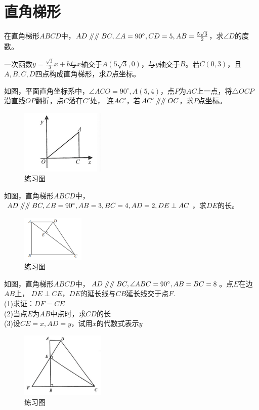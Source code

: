\documentclass{ecnuthesis}
\newcommand\px{\mathrel{/\mkern-5mu/}}  %
\begin{document}
\section{直角梯形}
\begin{problem}
    在直角梯形$ABCD$中，$AD\px\px BC,\angle A=90^\circ,CD=5,AB=\frac{5\sqrt3}{2}$，求$\angle D$的度数。\\
\end{problem}
\begin{problem}
    一次函数$y=\frac{\sqrt3}{3}x+b$与$x$轴交于$A(5\sqrt3,0)$，与$y$轴交于$B$。若$C(0,3)$，且$A,B,C,D$四点构成直角梯形，求$D$点坐标。\\
\end{problem}
\begin{problem}
    如图，平面直角坐标系中，$\angle ACO=90^\circ,A(5,4)$，点$P$为$AC$上一点，将$\triangle OCP$沿直线$OP$翻折，点$C$落在$C'$处，
    连$AC'$，若$AC'\px \px OC$，求$P$点坐标。
\end{problem}
\begin{problem}
\begin{figure}[H]
\centering
\includegraphics[width=4cm]{picture/6126.png}
\caption{练习图}
\end{figure}
    如图，直角梯形$ABCD$中，$AD\px\px BC,\angle B=90^\circ,AB=3,BC=4,AD=2,DE\perp AC$，求$DE$的长。
\end{problem}
\begin{figure}[H]
\centering
\includegraphics[width=3cm]{picture/689.png}
\caption{练习图}
\end{figure}
\begin{problem}
    如图，直角梯形$ABCD$中，$AD\px\px BC,\angle ABC=90^\circ,AB=BC=8$。点$E$在边$AB$上，
    $DE\perp CE$，$DE$的延长线与$CB$延长线交于点$F$. \\
    (1)求证：$DF=CE$ \\
    (2)当点$E$为$AB$中点时，求$CD$的长 \\
    (3)设$CE=x,AD=y$，试用$x$的代数式表示$y$ \\
\end{problem}
\begin{figure}[H]
\centering
\includegraphics[width=4cm]{picture/685.png}
\caption{练习图}
\end{figure}
\clearpage
\end{document}
